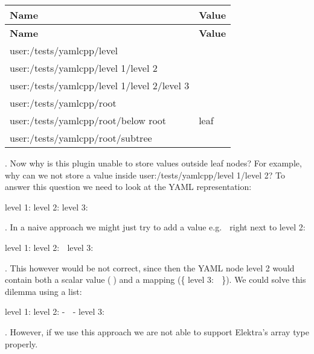 \tabulinesep=1mm
\begin{longtabu} spread 0pt [c]{*{2}{|X[-1]}|}
\hline
\rowcolor{\tableheadbgcolor}\textbf{ Name }&\textbf{ Value  }\\
\endfirsthead
\hline
\endfoot
\hline
\rowcolor{\tableheadbgcolor}\textbf{ Name }&\textbf{ Value  }\\
\endhead
user\+:/tests/yamlcpp/level &\\
user\+:/tests/yamlcpp/level 1/level 2 &\\
user\+:/tests/yamlcpp/level 1/level 2/level 3 &🍁 \\
user\+:/tests/yamlcpp/root &\\
user\+:/tests/yamlcpp/root/below root &leaf \\
user\+:/tests/yamlcpp/root/subtree &🍂 \\
\end{longtabu}
. Now why is this plugin unable to store values outside leaf nodes? For example, why can we not store a value inside {\ttfamily user\+:/tests/yamlcpp/level 1/level 2}? To answer this question we need to look at the Y\+A\+ML representation\+:


\begin{DoxyCode}
level 1:
  level 2:
    level 3: 🍁
\end{DoxyCode}


. In a naive approach we might just try to add a value e.\+g. {\ttfamily 🙈} right next to level 2\+:


\begin{DoxyCode}
level 1:
  level 2: 🙈
    level 3:  🍁
\end{DoxyCode}


. This however would be not correct, since then the Y\+A\+ML node {\ttfamily level 2} would contain both a scalar value ({\ttfamily 🙈}) and a mapping ({\ttfamily \{ level 3\+: 🍁 \}}). We could solve this dilemma using a list\+:


\begin{DoxyCode}
level 1:
  level 2:
    - 🙈
    - level 3: 🍁
\end{DoxyCode}


. However, if we use this approach we are not able to support Elektra’s array type properly.
